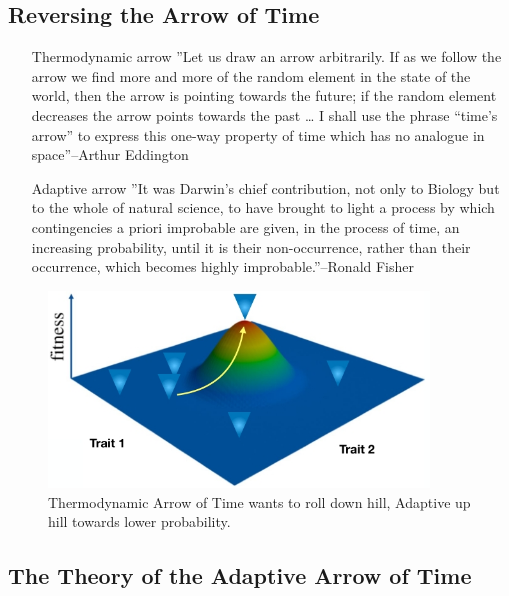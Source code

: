 \documentclass[]{article}
\begin{document}
\subsection{Reversing the Arrow of Time}

\begin{itemize}
	\item[Thermodynamic arrow] ''Let us draw an arrow arbitrarily. If as we follow the arrow we find more and more
	of the random element in the state of the world, then the arrow is pointing towards
	the future; if the random element decreases the arrow points towards the past … I
	shall use the phrase “time's arrow” to express this one-way property of time which
	has no analogue in space''--Arthur Eddington\cite{eddington1939philosophy}
	
	\item[Adaptive arrow]''It was Darwin’s chief contribution, not only to Biology but to the whole of natural science, to have brought to light a process by which contingencies a priori
	improbable are given, in the process of time, an increasing probability, until it is their non-occurrence, rather than their occurrence, which becomes highly improbable.''--Ronald Fisher\cite{fisher1930genetical}
\end{itemize}

\begin{figure}[H]
	\caption{Thermodynamic Arrow of Time wants to roll down hill, Adaptive up hill towards lower probability.}\label{fig:NaturalSelection}
	\includegraphics[width=0.9\textwidth]{NaturalSelection}
\end{figure}

\subsection{The Theory of the Adaptive Arrow of Time}
\end{document}

